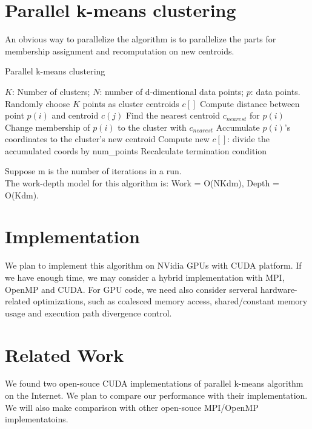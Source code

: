 \documentclass{article}
\begin{document}
\section{Parallel k-means clustering}
An obvious way to parallelize the algorithm is to parallelize the
parts for membership assignment and recomputation on new centroids.
\begin{algorithm}
  \caption{Parallel k-means clustering} \label{par}
  \begin{algorithmic}[1]
    \INPUT $K$: Number of clusters; $N$: number of d-dimentional data points; $p$: data points.
     \label{alg:p}
    \State Randomly choose $K$ points as cluster centroids $c[]$
    \State Compute distance between point $p(i)$ and centroid $c(j)$
    \EndFor
    \State Find the nearest centroid $c_{nearest}$ for $p(i)$
    \State Change membership of $p(i)$ to the cluster with $c_{nearest}$
    \State Accumulate $p(i)$'s coordinates to the cluster's new centroid
    \EndParFor
    \State Compute new $c[]$: divide the accumulated coords by num\_points
    \State Recalculate termination condition
    \EndWhile
    \EndFunction  
  \end{algorithmic}
\end{algorithm}

\vspace{5mm}
\noindent
Suppose m is the number of iterations in a run. \\
The work-depth model for this algorithm is: Work = O(NKdm), Depth = O(Kdm).

\section{Implementation}
We plan to implement this algorithm on NVidia GPUs with CUDA platform. If we have
enough time, we may consider a hybrid implementation with MPI, OpenMP
and CUDA. For GPU code, we need also consider serveral
hardware-related optimizations, such as coalesced memory
access, shared/constant memory usage and execution path divergence control.

\section{Related Work}
We found two open-souce CUDA implementations of parallel k-means
algorithm~\cite{serban-kmeans, gpuminer} on the Internet. We plan to compare
our performance with their implementation. We will also make comparison with 
other open-souce MPI/OpenMP implementatoins.
\end{document}
